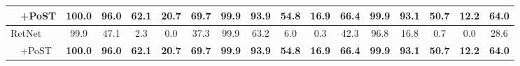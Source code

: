 \begin{table}[t]
{\begin{tabular}{@{}l ccccc ccccc ccccc @{}}
$\quad$+PoST       & 100.0 & 96.0 & 62.1 & 20.7 & 69.7 & 99.9 & 93.9 & \textbf{54.8} & \textbf{16.9} & \textbf{66.4} & \textbf{99.9} & \textbf{93.1} & \textbf{50.7} & \textbf{12.2} & \textbf{64.0} \\
\midrule
RetNet               & 99.9 & 47.1 & 2.3 & 0.0 & 37.3 & 99.9 & 63.2 & 6.0 & 0.3 & 42.3 & 96.8 & 16.8 & 0.7 & 0.0 & 28.6 \\
$\quad$+PoST       & \textbf{100.0} & \textbf{96.0} & \textbf{62.1} & \textbf{20.7} & \textbf{69.7} & \textbf{99.9} & \textbf{93.9} & \textbf{54.8} & \textbf{16.9} & \textbf{66.4} & \textbf{99.9} & \textbf{93.1} & \textbf{50.7} & \textbf{12.2} & \textbf{64.0} \\
\bottomrule
\end{tabular}%
}
\end{table}
